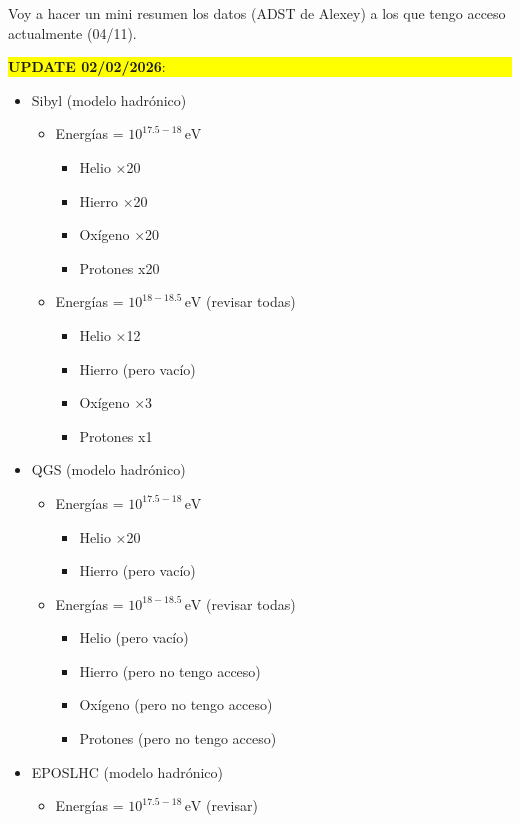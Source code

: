 Voy a hacer un mini resumen los datos (ADST de Alexey) a los que tengo acceso actualmente (04/11). 

\colorbox{yellow}{
	\parbox{\dimexpr\textwidth-2\fboxsep}{%
		\textbf{UPDATE 02/02/2026}:}}

\begin{itemize}
	\item Sibyl (modelo hadrónico)
	\begin{itemize}
		\item Energías = $10^{17.5-18}\,\text{eV}$
		\begin{itemize}
			\item Helio ×20
			\item Hierro ×20
			\item Oxígeno ×20
			\item Protones x20
		\end{itemize}
		\item Energías = $10^{18-18.5}\,\text{eV}$ (revisar todas)
		\begin{itemize}
			\item Helio ×12
			\item Hierro (pero vacío)
			\item Oxígeno ×3
			\item Protones x1
		\end{itemize}
	\end{itemize}
	\item QGS (modelo hadrónico)
	\begin{itemize}
		\item Energías = $10^{17.5-18}\,\text{eV}$
		\begin{itemize}
			\item Helio ×20
			\item Hierro (pero vacío)
		\end{itemize}
		\item Energías = $10^{18-18.5}\,\text{eV}$ (revisar todas)
		\begin{itemize}
			\item Helio (pero vacío)
			\item Hierro (pero no tengo acceso)
			\item Oxígeno (pero no tengo acceso)
			\item Protones (pero no tengo acceso)
		\end{itemize}
	\end{itemize}
	\item EPOSLHC (modelo hadrónico)
	\begin{itemize}
		\item Energías = $10^{17.5-18}\,\text{eV}$ (revisar)

\end{itemize}
\end{itemize}
